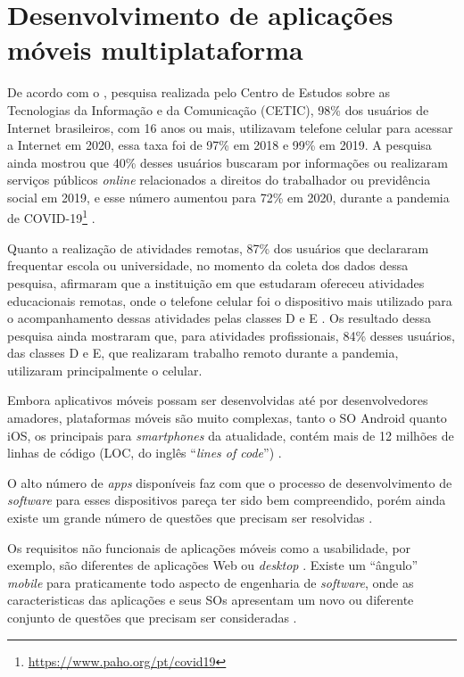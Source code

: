 \section{Desenvolvimento de aplicações móveis multiplataforma}

De acordo com o , pesquisa realizada pelo Centro de Estudos sobre
as Tecnologias da Informação e da Comunicação (CETIC), 98\% dos usuários de Internet brasileiros, com 16 anos ou mais,
utilizavam telefone celular para acessar a Internet em 2020, essa taxa foi de 97\% em 2018 e 99\% em 2019.
A pesquisa ainda mostrou que 40\% desses usuários buscaram por informações ou realizaram serviços públicos \emph{online} relacionados
a direitos do trabalhador ou previdência social em 2019, e esse número aumentou para 72\% em
2020, durante a pandemia de COVID-19\footnote{\url{https://www.paho.org/pt/covid19}} \cite{CETIC_2021}.

Quanto a realização de atividades remotas, 87\% dos usuários que declararam frequentar escola ou universidade, no momento da coleta
dos dados dessa pesquisa, afirmaram que a instituição em que estudaram ofereceu atividades educacionais remotas, onde o telefone
celular foi o dispositivo mais utilizado para o acompanhamento dessas atividades pelas classes D e E \cite{CETIC_2021}. Os resultado dessa pesquisa
ainda mostraram que, para atividades profissionais, 84\% desses usuários, das classes D e E, que realizaram trabalho remoto durante a pandemia,
utilizaram principalmente o celular.

Embora aplicativos móveis possam ser desenvolvidas até por desenvolvedores amadores, plataformas móveis são muito complexas, tanto o
SO Android quanto iOS, os principais para \emph{smartphones} da atualidade, contém mais de 12 milhões de linhas de código
(LOC, do inglês ``\emph{lines of code}'') \cite{pressman2014software}.

O alto número de \emph{apps} disponíveis faz com que o processo de desenvolvimento de \emph{software} para esses dispositivos pareça
ter sido bem compreendido, porém ainda existe um grande número de questões que precisam ser resolvidas \cite{pressman2014software,Wasserman2010}.

Os requisitos não funcionais de aplicações móveis como a usabilidade, por exemplo, são diferentes de aplicações Web ou \emph{desktop} \cite{pressman2014software}. 
Existe um ``ângulo'' \emph{mobile} para praticamente todo aspecto de engenharia de \emph{software}, onde as caracteristicas
das aplicações e seus SOs apresentam um novo ou diferente conjunto de questões que precisam ser consideradas \cite{Wasserman2010}.

